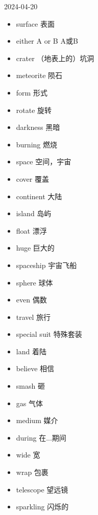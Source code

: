 \documentclass{article}
\begin{document}
2024-04-20

\begin{itemize}
\item surface 表面
\item either A or B A或B
\item crater （地表上的）坑洞
\item meteorite 陨石
\item form 形式
\item rotate 旋转
\item darkness 黑暗
\item burning 燃烧
\item space 空间，宇宙
\item cover 覆盖
\item continent 大陆
\item island 岛屿
\item float 漂浮
\item huge 巨大的
\item spaceship 宇宙飞船
\item sphere 球体
\item even 偶数
\item travel 旅行
\item special suit 特殊套装
\item land 着陆
\item believe 相信
\item smash 砸
\item gas 气体
\item medium 媒介
\item during 在...期间
\item wide 宽
\item wrap 包裹
\item telescope 望远镜
\item sparkling 闪烁的
\end{itemize} 
\end{document}
